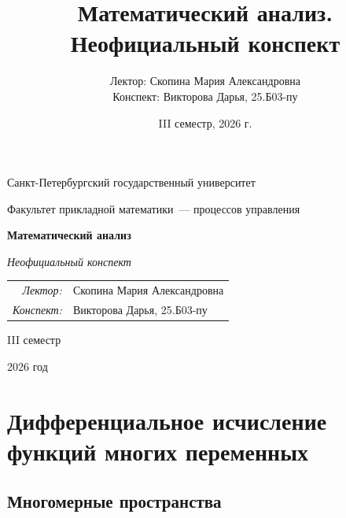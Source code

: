 \documentclass[12pt,a4paper]{report}
\title{Математический анализ. Неофициальный конспект}
\author{Лектор: Скопина Мария Александровна\\
Конспект: Викторова Дарья, 25.Б03-пу}
\date{III семестр, 2026 г.}
\begin{document}
\begin{titlepage}
    \thispagestyle{empty}
    \begin{center}
        \vspace*{0.6cm}

        {\large Санкт-Петербургский государственный университет\par}
        \vspace{0.35em}
        {\normalsize Факультет прикладной математики~--- процессов управления\par}

        \vspace*{5.1cm}

        {\fontsize{30}{35}\selectfont\bfseries Математический анализ\par}
        \vspace{0.65em}
        {\fontsize{17}{21}\selectfont\itshape Неофициальный конспект\par}

        \vspace{2.7cm}

        {\normalsize
        \begin{tabular}{@{}rl@{}}
            \textit{Лектор:} & Скопина Мария Александровна \\
            \textit{Конспект:} & Викторова Дарья, 25.Б03-пу
        \end{tabular}\par}

        \vfill

        {\large III семестр\par}
        \vspace{0.22em}
        {\large 2026 год\par}
        \vspace*{0.55cm}
    \end{center}
\end{titlepage}

\tableofcontents
\newpage

\setcounter{lection}{0}

\chapter{Дифференциальное исчисление функций многих переменных}

\section{Многомерные пространства}
\end{document}
